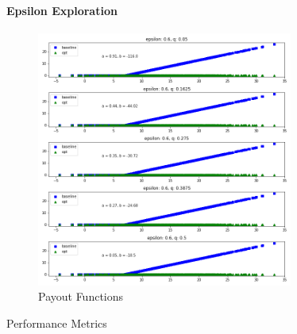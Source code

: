\documentclass[11pt]{article}
\begin{document}
            \paragraph*{Epsilon Exploration}
                \begin{figure}[H]
                    \centering
                    \caption{Payout Functions}
                    \includegraphics[width=0.75\textwidth]{../../output/figures/Premium/epsilon_exploration_full.png}
                \end{figure}

                \begin{table}[H]
                    \centering
                    \caption{Performance Metrics}
                    
                \end{table}

                \FloatBarrier
\end{document}
